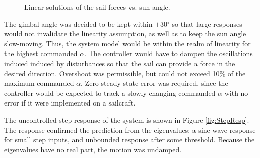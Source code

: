 \documentclass[]{aiaa-tc}%
\begin{document}
	\vspace{5 mm}
	
	\begin{figure}[H]
		\centering
		\caption{Linear solutions of the sail forces vs. sun angle. }
		\label{fig:Force_linearity}
	\end{figure}	

	\vspace{5 mm}

	The gimbal angle was decided to be kept within $\pm$30$^{\circ}$ so that large responses would not invalidate the linearity assumption, as well as to keep the sun angle slow-moving. Thus, the system model would be within the realm of linearity for the highest commanded $\alpha$. The controller would have to dampen the oscillations induced induced by disturbances so that the sail can provide a force in the desired direction. Overshoot was permissible, but could not exceed 10\% of the maximum commanded $\alpha$. Zero steady-state error was required, since the controller would be expected to track a slowly-changing commanded $\alpha$ with no error if it were implemented on a sailcraft. 

	\vspace{5 mm}

	The uncontrolled step response of the system is shown in Figure \ref{fig:StepResp}. The response confirmed the prediction from the eigenvalues: a sine-wave response for small step inputs, and unbounded response after some threshold. Because the eigenvalues have no real part, the motion was undamped.
\end{document}
